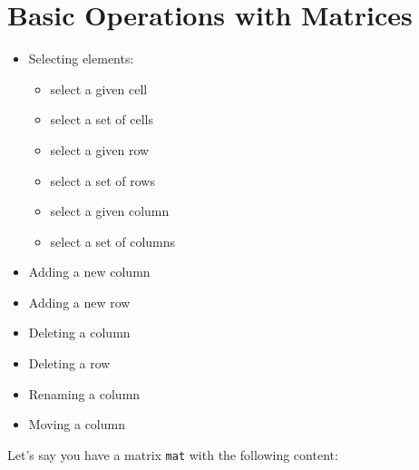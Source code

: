 \documentclass[
]{book}
\providecommand{\tightlist}{%
  \setlength{\itemsep}{0pt}\setlength{\parskip}{0pt}}
\begin{document}
\hypertarget{basic-operations-with-matrices}{%
\section{Basic Operations with Matrices}\label{basic-operations-with-matrices}}

\begin{itemize}
\tightlist
\item
  Selecting elements:

  \begin{itemize}
  \tightlist
  \item
    select a given cell
  \item
    select a set of cells
  \item
    select a given row
  \item
    select a set of rows
  \item
    select a given column
  \item
    select a set of columns
  \end{itemize}
\item
  Adding a new column
\item
  Adding a new row
\item
  Deleting a column
\item
  Deleting a row
\item
  Renaming a column
\item
  Moving a column
\end{itemize}

Let's say you have a matrix \texttt{mat} with the following content:
\end{document}
